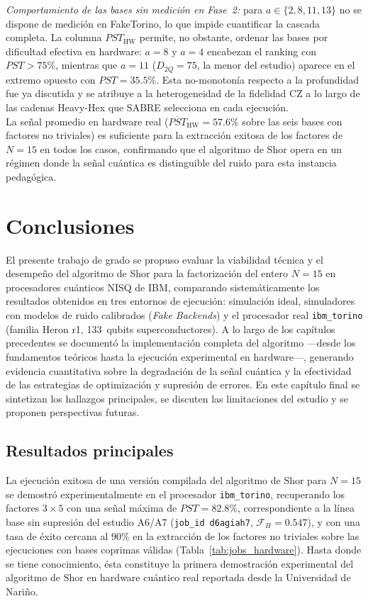 \documentclass[12pt, spanish]{book}
\begin{document}
\textit{Comportamiento de las bases sin medición en Fase~2:} para $a \in \{2, 8, 11, 13\}$ no se dispone de medición en FakeTorino, lo que impide cuantificar la cascada completa. La columna $PST_{\text{HW}}$ permite, no obstante, ordenar las bases por dificultad efectiva en hardware: $a = 8$ y $a = 4$ encabezan el ranking con $PST > 75\%$, mientras que $a = 11$ ($D_{2Q} = 75$, la menor del estudio) aparece en el extremo opuesto con $PST = 35.5\%$. Esta no-monotonía respecto a la profundidad fue ya discutida y se atribuye a la heterogeneidad de la fidelidad CZ a lo largo de las cadenas Heavy-Hex que SABRE selecciona en cada ejecución.\\

La señal promedio en hardware real ($\overline{PST}_{\text{HW}} = 57.6\%$ sobre las seis bases con factores no triviales) es suficiente para la extracción exitosa de los factores de $N = 15$ en todos los casos, confirmando que el algoritmo de Shor opera en un régimen donde la señal cuántica es distinguible del ruido para esta instancia pedagógica.


\chapter{Conclusiones}
\label{cap:conclusiones}

El presente trabajo de grado se propuso evaluar la viabilidad técnica y el desempeño del algoritmo de Shor para la factorización del entero $N = 15$ en procesadores cuánticos NISQ de IBM, comparando sistemáticamente los resultados obtenidos en tres entornos de ejecución: simulación ideal, simuladores con modelos de ruido calibrados (\textit{Fake Backends}) y el procesador real \texttt{ibm\_torino} (familia Heron r1, 133~qubits superconductores). A lo largo de los capítulos precedentes se documentó la implementación completa del algoritmo ---desde los fundamentos teóricos hasta la ejecución experimental en hardware---, generando evidencia cuantitativa sobre la degradación de la señal cuántica y la efectividad de las estrategias de optimización y supresión de errores. En este capítulo final se sintetizan los hallazgos principales, se discuten las limitaciones del estudio y se proponen perspectivas futuras.

\section{Resultados principales}

La ejecución exitosa de una versión compilada del algoritmo de Shor para $N = 15$ se demostró experimentalmente en el procesador \texttt{ibm\_torino}, recuperando los factores $3 \times 5$ con una señal máxima de $PST = 82.8\%$, correspondiente a la línea base sin supresión del estudio A6/A7 (\texttt{job\_id}~\texttt{d6agiah7}, $\mathcal{F}_H = 0.547$), y con una tasa de éxito cercana al $90\%$ en la extracción de los factores no triviales sobre las ejecuciones con bases coprimas válidas (Tabla~\ref{tab:jobs_hardware}). Hasta donde se tiene conocimiento, ésta constituye la primera demostración experimental del algoritmo de Shor en hardware cuántico real reportada desde la Universidad de Nariño.\\
\end{document}
